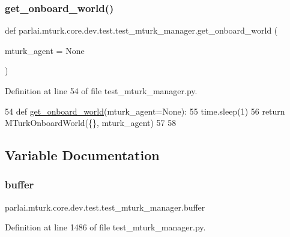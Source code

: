 \subsubsection{\texorpdfstring{get\+\_\+onboard\+\_\+world()}{get\_onboard\_world()}}
{\footnotesize\ttfamily def parlai.\+mturk.\+core.\+dev.\+test.\+test\+\_\+mturk\+\_\+manager.\+get\+\_\+onboard\+\_\+world (\begin{DoxyParamCaption}\item[{}]{mturk\+\_\+agent = {\ttfamily None} }\end{DoxyParamCaption})}



Definition at line 54 of file test\+\_\+mturk\+\_\+manager.\+py.


\begin{DoxyCode}
54 \textcolor{keyword}{def }\hyperlink{namespaceparlai_1_1mturk_1_1core_1_1dev_1_1test_1_1test__mturk__manager_aafd69ff9f051e4dd382a610b58f65710}{get\_onboard\_world}(mturk\_agent=None):
55     time.sleep(1)
56     \textcolor{keywordflow}{return} MTurkOnboardWorld(\{\}, mturk\_agent)
57 
58 
\end{DoxyCode}


\subsection{Variable Documentation}
\mbox{\label{namespaceparlai_1_1mturk_1_1core_1_1dev_1_1test_1_1test__mturk__manager_aa1a430d335fde5f882f41d647e3a3d80}} 
\subsubsection{\texorpdfstring{buffer}{buffer}}
{\footnotesize\ttfamily parlai.\+mturk.\+core.\+dev.\+test.\+test\+\_\+mturk\+\_\+manager.\+buffer}



Definition at line 1486 of file test\+\_\+mturk\+\_\+manager.\+py.

\mbox{\label{namespaceparlai_1_1mturk_1_1core_1_1dev_1_1test_1_1test__mturk__manager_a73c6802604531bbc44c37264afe51bfd}} 
